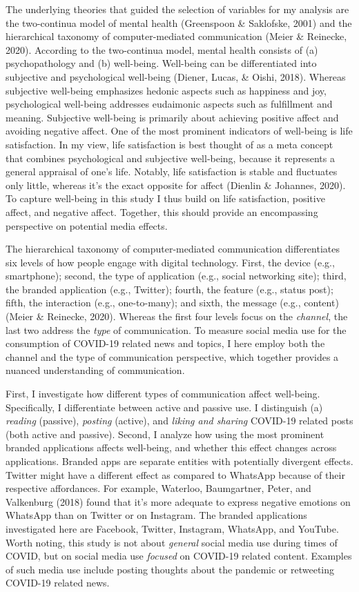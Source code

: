 \documentclass[
  english,
  man,mask,floatsintext]{apa6}
\begin{document}
The underlying theories that guided the selection of variables for my analysis are the two-continua model of mental health (Greenspoon \& Saklofske, 2001) and the hierarchical taxonomy of computer-mediated communication (Meier \& Reinecke, 2020).
According to the two-continua model, mental health consists of (a) psychopathology and (b) well-being.
Well-being can be differentiated into subjective and psychological well-being (Diener, Lucas, \& Oishi, 2018).
Whereas subjective well-being emphasizes hedonic aspects such as happiness and joy, psychological well-being addresses eudaimonic aspects such as fulfillment and meaning.
Subjective well-being is primarily about achieving positive affect and avoiding negative affect.
One of the most prominent indicators of well-being is life satisfaction.
In my view, life satisfaction is best thought of as a meta concept that combines psychological and subjective well-being, because it represents a general appraisal of one's life.
Notably, life satisfaction is stable and fluctuates only little, whereas it's the exact opposite for affect (Dienlin \& Johannes, 2020).
To capture well-being in this study I thus build on life satisfaction, positive affect, and negative affect.
Together, this should provide an encompassing perspective on potential media effects.

The hierarchical taxonomy of computer-mediated communication differentiates six levels of how people engage with digital technology.
First, the device (e.g., smartphone); second, the type of application (e.g., social networking site); third, the branded application (e.g., Twitter); fourth, the feature (e.g., status post); fifth, the interaction (e.g., one-to-many); and sixth, the message (e.g., content) (Meier \& Reinecke, 2020).
Whereas the first four levels focus on the \emph{channel}, the last two address the \emph{type} of communication.
To measure social media use for the consumption of COVID-19 related news and topics, I here employ both the channel and the type of communication perspective, which together provides a nuanced understanding of communication.

First, I investigate how different types of communication affect well-being.
Specifically, I differentiate between active and passive use.
I distinguish (a) \emph{reading} (passive), \emph{posting} (active), and \emph{liking and sharing} COVID-19 related posts (both active and passive).
Second, I analyze how using the most prominent branded applications affects well-being, and whether this effect changes across applications.
Branded apps are separate entities with potentially divergent effects.
Twitter might have a different effect as compared to WhatsApp because of their respective affordances.
For example, Waterloo, Baumgartner, Peter, and Valkenburg (2018) found that it's more adequate to express negative emotions on WhatsApp than on Twitter or on Instagram.
The branded applications investigated here are Facebook, Twitter, Instagram, WhatsApp, and YouTube.
Worth noting, this study is not about \emph{general} social media use during times of COVID, but on social media use \emph{focused} on COVID-19 related content.
Examples of such media use include posting thoughts about the pandemic or retweeting COVID-19 related news.
\end{document}
